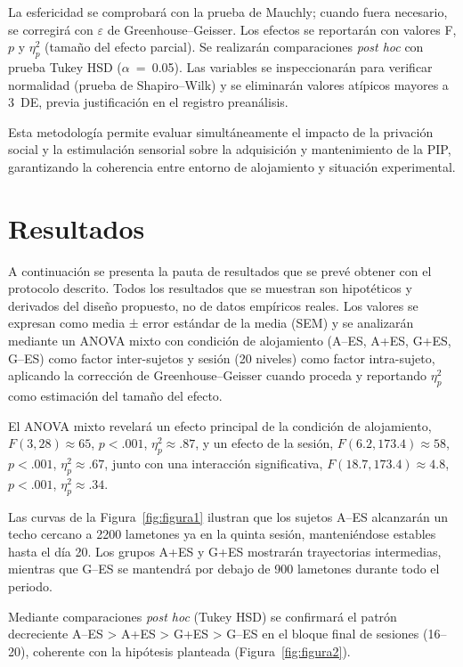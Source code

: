 \documentclass[12pt,a4paper]{article}
\begin{document}
\begin{multicols}{2}
La esfericidad se comprobará con la prueba de Mauchly; cuando fuera necesario, se corregirá con $\varepsilon$ de Greenhouse–Geisser. Los efectos se reportarán con valores F, $p$ y $\eta^2_p$ (tamaño del efecto parcial). Se realizarán comparaciones \textit{post hoc} con prueba Tukey HSD ($\alpha$~=~0.05). Las variables se inspeccionarán para verificar normalidad (prueba de Shapiro--Wilk) y se eliminarán valores atípicos mayores a $3$~DE, previa justificación en el registro preanálisis.


\vspace{2mm}
Esta metodología permite evaluar simultáneamente el impacto de la privación social y la estimulación sensorial sobre la adquisición y mantenimiento de la PIP, garantizando la coherencia entre entorno de alojamiento y situación experimental.



\section{Resultados}

A continuación se presenta la pauta de resultados que se prevé obtener con el protocolo descrito. Todos los resultados que se muestran son hipotéticos y derivados del diseño propuesto, no de datos empíricos reales. Los valores se expresan como media ± error estándar de la media (SEM) y se analizarán mediante un ANOVA mixto con condición de alojamiento (A--ES, A+ES, G+ES, G--ES) como factor inter-sujetos y sesión (20 niveles) como factor intra-sujeto, aplicando la corrección de Greenhouse–Geisser cuando proceda y reportando $\eta^2_p$ como estimación del tamaño del efecto.

El ANOVA mixto revelará un efecto principal de la condición de alojamiento, $F(3, 28) \approx 65$, $p < .001$, $\eta^2_p \approx .87$, y un efecto de la sesión, $F(6.2, 173.4) \approx 58$, $p < .001$, $\eta^2_p \approx .67$, junto con una interacción significativa, $F(18.7, 173.4) \approx 4.8$, $p < .001$, $\eta^2_p \approx .34$.

Las curvas de la Figura~\ref{fig:figura1} ilustran que los sujetos A--ES alcanzarán un techo cercano a 2200 lametones ya en la quinta sesión, manteniéndose estables hasta el día 20. Los grupos A+ES y G+ES mostrarán trayectorias intermedias, mientras que G--ES se mantendrá por debajo de 900 lametones durante todo el periodo.

Mediante comparaciones \textit{post hoc} (Tukey HSD) se confirmará el patrón decreciente A--ES > A+ES > G+ES > G--ES en el bloque final de sesiones (16–20), coherente con la hipótesis planteada (Figura~\ref{fig:figura2}).


\end{multicols}
\end{document}
